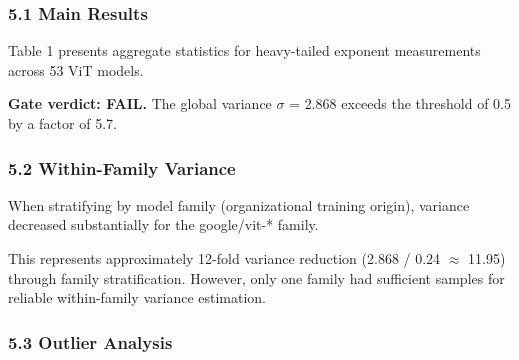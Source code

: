 
\subsubsection{5.1 Main Results}

Table 1 presents aggregate statistics for heavy-tailed exponent measurements across 53 ViT models.

\begin{table}[htbp]
\centering
{}
\end{table}

\textbf{Gate verdict: FAIL.} The global variance $\sigma$ = 2.868 exceeds the threshold of 0.5 by a factor of 5.7.

\subsubsection{5.2 Within-Family Variance}

When stratifying by model family (organizational training origin), variance decreased substantially for the google/vit-* family.

\begin{table}[htbp]
\centering
{}
\end{table}

This represents approximately 12-fold variance reduction (2.868 / 0.24 $\approx$ 11.95) through family stratification. However, only one family had sufficient samples for reliable within-family variance estimation.

\subsubsection{5.3 Outlier Analysis}

